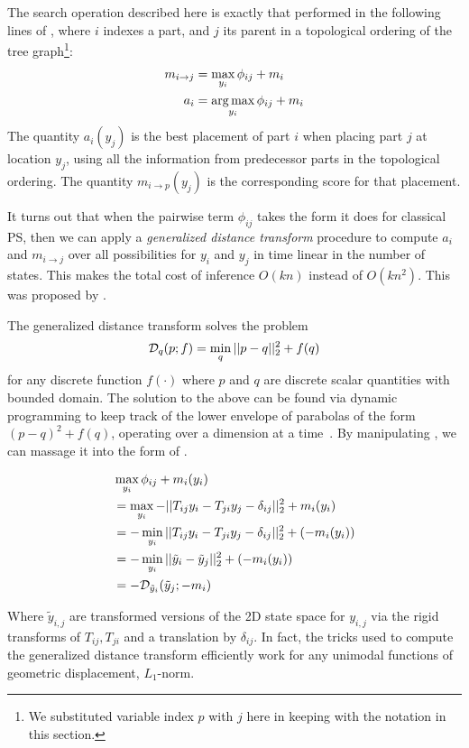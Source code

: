 The search operation described here is exactly that performed in the following 
lines of , where $i$ indexes a part, and $j$ its parent 
in a topological ordering of the tree graph\footnote{We substituted variable 
index $p$ with $j$ here in keeping with the notation in this section.}:
\begin{align}
\label{eq:pairwise-max}
m_{i \rightarrow j} &= \max_{y_i} \phi_{ij} + m_i\\
a_i &= \mathop{\arg\max}_{y_i} \phi_{ij} + m_i
\end{align}
The quantity $a_i(y_j)$ is the best placement of part $i$ when placing part $j$ 
at location $y_j$, using all the information from predecessor parts in the 
topological ordering.  The quantity $m_{i \rightarrow p}(y_j)$ is the 
corresponding score for that placement.  

It turns out that when the pairwise term $\phi_{ij} $ takes the form it does 
for classical PS, then we can apply a {\em generalized distance transform} 
procedure to compute $a_i$ and $m_{i \rightarrow j}$ over all possibilities for 
$y_i$ and $y_j$ in time linear in the number of states. This makes the total 
cost of inference $O(kn)$ instead of $O(kn^2)$. This was proposed by 
\citet{felz05}.

The generalized distance transform solves the problem
\begin{align}
\label{eq:dt-prob}
\mathcal{D}_q(p; f) = \min_q ||p-q||_2^2 + f(q)
\end{align}
for any discrete function $f(\cdot)$ where $p$ and $q$ are discrete scalar 
quantities with bounded domain.  The solution to the above can be found via 
dynamic programming to keep track of the lower envelope of parabolas of the 
form $(p-q)^2 + f(q)$, operating over a dimension at a time~\citep{felz-dt}.  
By manipulating , we can massage it into the form of 
.

\begin{align}
&\max_{y_i} \phi_{ij} + m_i(y_i)\\
&= \max_{y_i} -||T_{ij}y_i - T_{ji}y_j - \delta_{ij}||_2^2 + m_i(y_i) \\
&= -\min_{y_i} ||T_{ij}y_i - T_{ji}y_j - \delta_{ij}||_2^2 + (-m_i(y_i)) \\
&= -\min_{y_i} ||\tilde{y}_i - \tilde{y}_j||_2^2 + (-m_i(y_i)) \\
&= -\mathcal{D}_{\tilde{y}_i}(\tilde{y}_j; -m_i)
\end{align}

Where $\tilde{y}_{i,j}$ are transformed versions of the 2D state space for 
$y_{i,j}$ via the rigid transforms of $T_{ij},T_{ji}$ and a translation by 
$\delta_{ij}$.  In fact, the tricks used to compute the generalized distance 
transform efficiently work for any unimodal functions of geometric 
displacement, \eg $L_1$-norm. 


